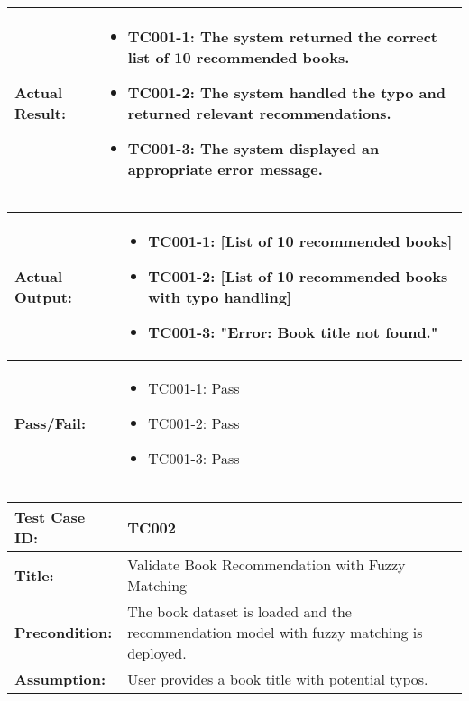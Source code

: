 \documentclass{article}
\begin{document}
\noindent
\begin{tabularx}{\textwidth}{|>{\raggedright\arraybackslash}p{4cm}|X|}
    \hline
    \textbf{Actual Result:} & 
    \begin{itemize}
        \item TC001-1: The system returned the correct list of 10 recommended books.
        \item TC001-2: The system handled the typo and returned relevant recommendations.
        \item TC001-3: The system displayed an appropriate error message.
    \end{itemize}
    \\ \hline
\end{tabularx}

\noindent
\begin{tabularx}{\textwidth}{|>{\raggedright\arraybackslash}p{4cm}|X|}
    \hline
    \textbf{Actual Output:} & 
    \begin{itemize}
        \item TC001-1: [List of 10 recommended books]
        \item TC001-2: [List of 10 recommended books with typo handling]
        \item TC001-3: "Error: Book title not found."
    \end{itemize}
    \\ \hline
    \textbf{Pass/Fail:} & 
    \begin{itemize}
        \item TC001-1: Pass
        \item TC001-2: Pass
        \item TC001-3: Pass
    \end{itemize}
    \\ \hline
\end{tabularx}

\noindent
\begin{tabularx}{\textwidth}{|>{\raggedright\arraybackslash}p{4cm}|X|}
    \hline
    \textbf{Test Case ID:} & TC002 \\ \hline
    \textbf{Title:} & Validate Book Recommendation with Fuzzy Matching \\ \hline
    \textbf{Precondition:} & The book dataset is loaded and the recommendation model with fuzzy matching is deployed. \\ \hline
    \textbf{Assumption:} & User provides a book title with potential typos. \\ \hline
\end{tabularx}
\end{document}
